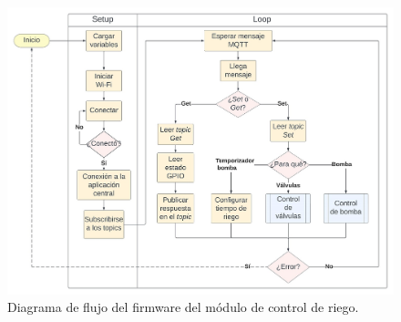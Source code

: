 \begin{figure}[!h]
	\centering
	\includegraphics[width=1.0\textwidth]{./Figures/chapter3/FirmwareRiegoControl.jpg}
	\caption[Diagrama de flujo del firmware del módulo de control de riego]{Diagrama de flujo del firmware del módulo de control de riego.}
	\label{fig:flow_riegocontrol}
\end{figure}
%
%
%
%
%
%




